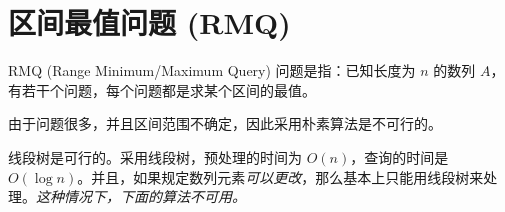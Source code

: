 \section{区间最值问题 (RMQ)}
	RMQ (Range Minimum/Maximum Query) 问题是指：已知长度为 $n$ 的数列 $A$，有若干个问题，每个问题都是求某个区间的最值。
	
	由于问题很多，并且区间范围不确定，因此采用朴素算法是不可行的。
	
	线段树是可行的。采用线段树，预处理的时间为 $O(n)$，查询的时间是 $O(\log n)$。并且，如果规定数列元素\emph{可以更改}，那么基本上只能用线段树来处理。\emph{这种情况下，下面的算法不可用。}

    
    
    
    
